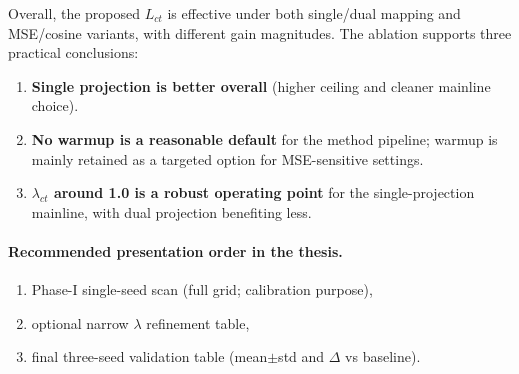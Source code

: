 Overall, the proposed $L_{ct}$ is effective under both single/dual mapping and MSE/cosine variants, with different gain magnitudes. The ablation supports three practical conclusions:
\begin{enumerate}
\item \textbf{Single projection is better overall} (higher ceiling and cleaner mainline choice).
\item \textbf{No warmup is a reasonable default} for the method pipeline; warmup is mainly retained as a targeted option for MSE-sensitive settings.
\item \textbf{$\lambda_{ct}$ around 1.0 is a robust operating point} for the single-projection mainline, with dual projection benefiting less.
\end{enumerate}

\paragraph{Recommended presentation order in the thesis.}
\begin{enumerate}
\item Phase-I single-seed scan (full grid; calibration purpose),
\item optional narrow $\lambda$ refinement table,
\item final three-seed validation table (mean$\pm$std and $\Delta$ vs baseline).
\end{enumerate}

